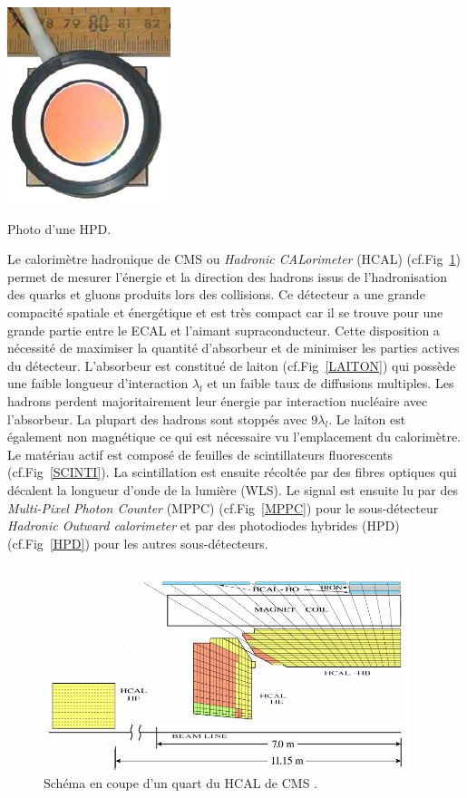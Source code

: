 \marginpar
{
	\centering
	\includegraphics[width=\marginparwidth]{CMS/HPD.png}
	\captionsetup{type=figure}\caption{Photo d'une HPD.}
	\label{HPD}
}
Le calorimètre hadronique de CMS ou \textit{Hadronic CALorimeter} (HCAL) (cf.Fig~\ref{HCAL}) permet de mesurer l'énergie et la direction des hadrons issus de l'hadronisation des quarks et gluons produits lors des collisions. Ce détecteur a une grande compacité spatiale et énergétique et est très compact car il se trouve pour une grande partie entre le ECAL et l'aimant supraconducteur. Cette disposition a nécessité de maximiser la quantité d'absorbeur et de minimiser les parties actives du détecteur. L'absorbeur est constitué de laiton (cf.Fig~\ref{LAITON}) qui possède une faible longueur d'interaction $\lambda_{l}$ et un faible taux de diffusions multiples. Les hadrons perdent majoritairement leur énergie par interaction nucléaire avec l'absorbeur. La plupart des hadrons sont stoppés avec $\num{9}\lambda_{l}$. Le laiton est également non magnétique ce qui est nécessaire vu l'emplacement du calorimètre. Le matériau actif est composé de feuilles de scintillateurs fluorescents (cf.Fig~\ref{SCINTI}). La scintillation est ensuite récoltée par des fibres optiques qui décalent la longueur d'onde de la lumière (WLS). Le signal est ensuite lu par des \textit{Multi-Pixel Photon Counter} (MPPC) (cf.Fig~\ref{MPPC}) pour le sous-détecteur \textit{Hadronic Outward calorimeter} et par des photodiodes hybrides (HPD) (cf.Fig~\ref{HPD}) pour les autres sous-détecteurs.
\begin{figure}[ht!]
	\centering
	\includegraphics[width=0.95\textwidth]{CMS/HCALSCHEME.png}
	\captionsetup{type=figure}\caption{Schéma en coupe d'un quart du HCAL de CMS \cite{Mans:1481837}.}
	\label{HCAL}
\end{figure}

